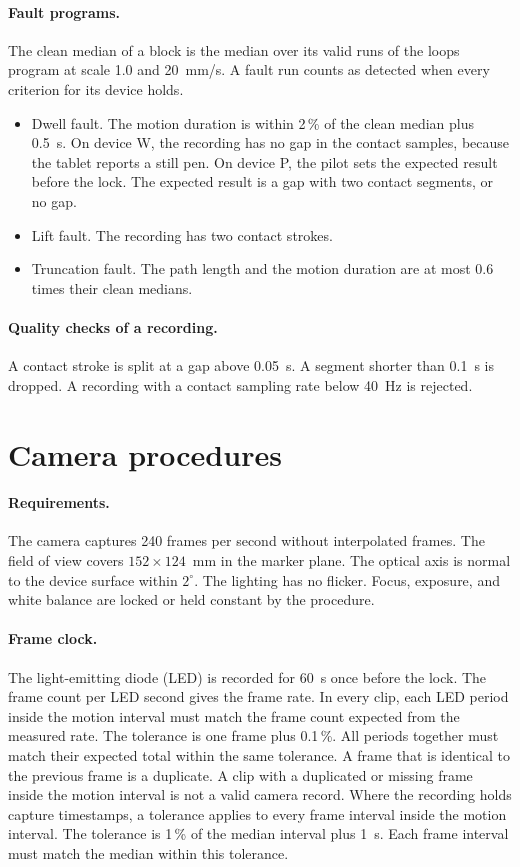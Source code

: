 \documentclass[11pt,a4paper]{article}
\begin{document}
\paragraph{Fault programs.}
The clean median of a block is the median over its valid runs of the loops program at scale 1.0 and 20~mm/s.
A fault run counts as detected when every criterion for its device holds.
\begin{itemize}
\item Dwell fault.
The motion duration is within 2\,\% of the clean median plus 0.5~s.
On device W, the recording has no gap in the contact samples, because the tablet reports a still pen.
On device P, the pilot sets the expected result before the lock.
The expected result is a gap with two contact segments, or no gap.
\item Lift fault.
The recording has two contact strokes.
\item Truncation fault.
The path length and the motion duration are at most 0.6 times their clean medians.
\end{itemize}

\paragraph{Quality checks of a recording.}
A contact stroke is split at a gap above 0.05~s.
A segment shorter than 0.1~s is dropped.
A recording with a contact sampling rate below 40~Hz is rejected.

\section{Camera procedures}
\label{sec:s-camera}
\paragraph{Requirements.}
The camera captures 240 frames per second without interpolated frames.
The field of view covers $152\times124$~mm in the marker plane.
The optical axis is normal to the device surface within $2^\circ$.
The lighting has no flicker.
Focus, exposure, and white balance are locked or held constant by the procedure.

\paragraph{Frame clock.}
The light-emitting diode (LED) is recorded for 60~s once before the lock.
The frame count per LED second gives the frame rate.
In every clip, each LED period inside the motion interval must match the frame count expected from the measured rate.
The tolerance is one frame plus 0.1\,\%.
All periods together must match their expected total within the same tolerance.
A frame that is identical to the previous frame is a duplicate.
A clip with a duplicated or missing frame inside the motion interval is not a valid camera record.
Where the recording holds capture timestamps, a tolerance applies to every frame interval inside the motion interval.
The tolerance is 1\,\% of the median interval plus 1~\textmu s.
Each frame interval must match the median within this tolerance.
\end{document}
